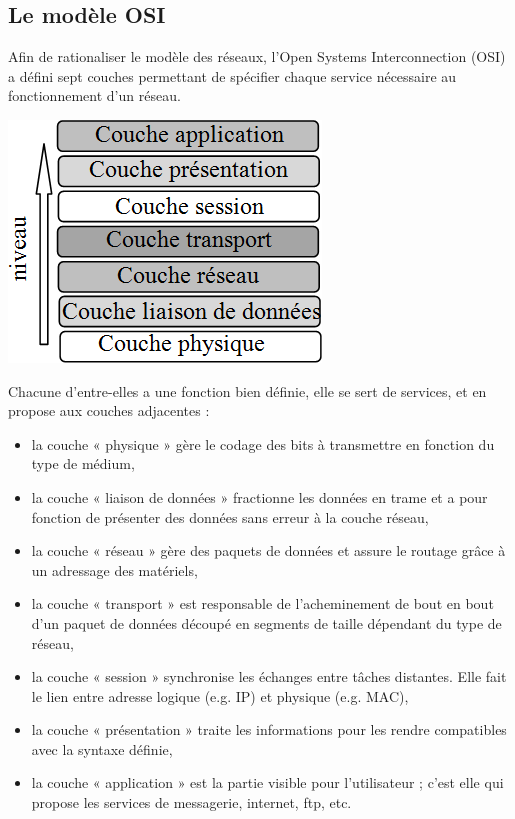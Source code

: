 \documentclass[10pt]{article}
\begin{document}
\subsection{Le modèle OSI}

\begin{minipage}[c]{.68\linewidth}
Afin de rationaliser le modèle des réseaux, l’Open Systems Interconnection (OSI) a défini sept couches permettant de spécifier chaque service nécessaire au fonctionnement d’un réseau.
\end{minipage} \hfill
\begin{minipage}[c]{.3\linewidth}
\begin{center}
\includegraphics[width=.95\textwidth]{images/fig_12}
\end{center}
\end{minipage} 

Chacune d’entre-elles a une fonction bien définie, elle se sert de services, et en propose aux couches adjacentes : 
\begin{itemize}
\item la couche « physique » gère le codage des bits à transmettre en fonction du type de médium,
\item la couche « liaison de données » fractionne les données en trame et a pour fonction de présenter des données sans erreur à la couche réseau,
\item la couche « réseau » gère des paquets de données et assure le routage grâce à un adressage des matériels,
\item la couche « transport » est responsable de l’acheminement de bout en bout d’un paquet de données découpé en segments de taille dépendant du type de réseau,
\item la couche « session » synchronise les échanges entre tâches distantes. Elle fait le lien entre adresse logique (e.g. IP) et physique (e.g. MAC),
\item la couche « présentation » traite les informations pour les rendre compatibles avec la syntaxe définie,
\item la couche « application » est la partie visible pour l’utilisateur ; c’est elle qui propose les services de messagerie, internet, ftp, etc.
\end{itemize}
\end{document}

